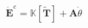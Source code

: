 \documentclass[preview]{standalone}
\begin{document}
\begin{align*}
\dot{\mathbf{E}}^e = \mathbb{K}[\tilde{\mathbf{T}}] + \mathbf{A} \dot{\theta}
\end{align*}
\end{document}
